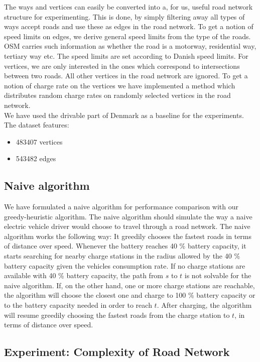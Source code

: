 The ways and vertices can easily be converted into a, for us, useful road network structure for experimenting. This is done, by simply filtering away all types of ways accept roads and use these as edges in the road network. To get a notion of speed limits on edges, we derive general speed limits from the type of the roads. OSM carries such information as whether the road is a motorway, residential way, tertiary way etc. The speed limits are set according to Danish speed limits. For vertices, we are only interested in the ones which correspond to intersections between two roads. All other vertices in the road network are ignored. To get a notion of charge rate on the vertices we have implemented a method which distributes random charge rates on randomly selected vertices in the road network.\\

We have used the drivable part of Denmark as a baseline for the experiments. The dataset features:
\begin{itemize}
    \item 483407 vertices
    \item 543482 edges
\end{itemize}

\subsection{Naive algorithm}
\label{sub:naivealgorithm}
We have formulated a naive algorithm for performance comparison with our greedy-heuristic algorithm. The naive algorithm should simulate the way a naive electric vehicle driver would choose to travel through a road network. The naive algorithm works the following way: It greedily chooses the fastest roads in terms of distance over speed. Whenever the battery reaches 40 \% battery capacity, it starts searching for nearby charge stations in the radius allowed by the 40 \% battery capacity given the vehicles consumption rate. If no charge stations are available with 40 \% battery capacity, the path from $s$ to $t$ is not solvable for the naive algorithm. If, on the other hand, one or more charge stations are reachable, the algorithm will choose the closest one and charge to 100 \% battery capacity or to the battery capacity needed in order to reach $t$. After charging, the algorithm will resume greedily choosing the fastest roads from the charge station to $t$, in terms of distance over speed.

\subsection{Experiment: Complexity of Road Network}


